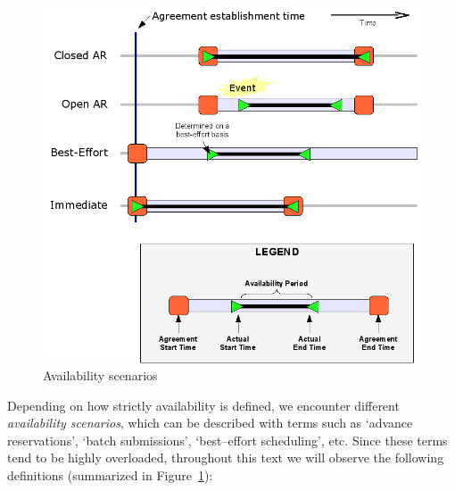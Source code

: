 \documentclass[singlespace]{ccw_chithesis}
\begin{document}
\begin{figure}
  \begin{center}
    \includegraphics[width=\textwidth]{figures/availability.png}
    \caption{Availability scenarios}
    \label{fig:availability}
  \end{center}
\end{figure}

Depending on how strictly availability is defined, we encounter different \emph{availability scenarios}, which can be described with terms such as `advance reservations', `batch submissions', `best--effort scheduling', etc. Since these terms tend to be highly overloaded, throughout this text we will observe the following definitions (summarized in Figure~\ref{fig:availability}):
\end{document}
